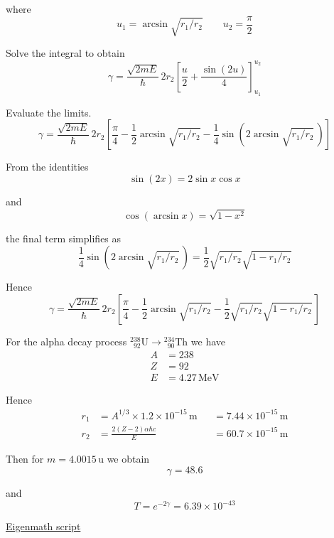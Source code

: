 where
\begin{equation*}
u_1=\arcsin\sqrt{r_1/r_2}
\qquad
u_2=\frac{\pi}{2}
\end{equation*}

Solve the integral to obtain
\begin{equation*}
\gamma=\frac{\sqrt{2mE}}{\hbar}\,2r_2\left[\frac{u}{2}+\frac{\sin(2u)}{4}\right]_{u_1}^{u_2}
\tag{1}
\end{equation*}

Evaluate the limits.
\begin{equation*}
\gamma=\frac{\sqrt{2mE}}{\hbar}\,2r_2
\left[
\frac{\pi}{4}
-\frac{1}{2}\arcsin\sqrt{r_1/r_2}
-\frac{1}{4}\sin\left(2\arcsin\sqrt{r_1/r_2}\,\right)
\right]
\tag{2}
\end{equation*}

From the identities
\begin{equation*}
\sin(2x)=2\sin x\cos x
\end{equation*}

and
\begin{equation*}
\cos(\arcsin x)=\sqrt{1-x^2}
\end{equation*}

the final term simplifies as
\begin{equation*}
\frac{1}{4}\sin\left(2\arcsin\sqrt{r_1/r_2}\,\right)
=\frac{1}{2}\sqrt{r_1/r_2}\sqrt{1-r_1/r_2}
\end{equation*}

Hence
\begin{equation*}
\gamma=\frac{\sqrt{2mE}}{\hbar}\,2r_2
\left[
\frac{\pi}{4}
-\frac{1}{2}\arcsin\sqrt{r_1/r_2}
-\frac{1}{2}\sqrt{r_1/r_2}\sqrt{1-r_1/r_2}\,
\right]
\end{equation*}

For the alpha decay process
${}^{238}_{\phantom{0}92}\mathrm U
\rightarrow{}^{234}_{\phantom{0}90}\mathrm{Th}$ we have
\begin{align*}
A&=238
\\
Z&=92
\\
E&=4.27\,\text{MeV}
\end{align*}

Hence
\begin{align*}
r_1&=A^{1/3}\times1.2\times10^{-15}\,\text{m} & &=7.44\times10^{-15}\,\text{m}
\\
r_2&=\frac{2(Z-2)\alpha\hbar c}{E} & &=60.7\times10^{-15}\,\text{m}
\end{align*}

Then for $m=4.0015\,\text{u}$ we obtain
\begin{equation*}
\gamma=48.6
\end{equation*}

and
\begin{equation*}
T=e^{-2\gamma}=6.39\times10^{-43}
\end{equation*}

\href{https://georgeweigt.github.io/examples/alpha-decay-demo.html}{Eigenmath script}


